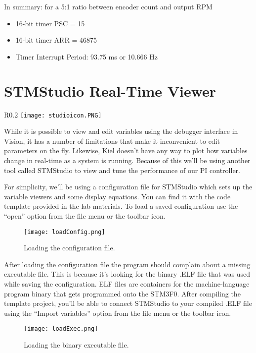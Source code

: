 \documentclass[openany,11pt,fleqn]{book} %
\begin{document}
In summary: for a 5:1 ratio between encoder count and output RPM
\begin{itemize}
    \item 16-bit timer PSC = 15 
    \item 16-bit timer ARR = 46875
    \item Timer Interrupt Period: 93.75 ms or 10.666 Hz
\end{itemize}


\section{STMStudio Real-Time Viewer}

\begin{wrapfigure}{R}{0.2\textwidth}
    \centering\texttt{[image: studioicon.PNG]}
\end{wrapfigure}

While it is possible to view and edit variables using the debugger interface in {\textmu}Vision, it has a number of limitations that make it inconvenient to edit parameters on the fly. Likewise, Kiel doesn't have any way to plot how variables change in real-time as a system is running. Because of this we'll be using another tool called STMStudio to view and tune the performance of our PI controller. 

\noindent For simplicity, we'll be using a configuration file for STMStudio which sets up the variable viewers and some display equations. You can find it with the code template provided in the lab materials. To load a saved configuration use the ``open'' option from the file menu or the toolbar icon.


\begin{figure}[tb]
    \centering\texttt{[image: loadConfig.png]}
    \caption{Loading the configuration file.}
    \label{loadConfig}
\end{figure}

After loading the configuration file the program should complain about a missing executable file. This is because it's looking for the binary .ELF file that was used while saving the configuration. ELF files are containers for the machine-language program binary that gets programmed onto the STM3F0. After compiling the template project, you'll be able to connect STMStudio to your compiled .ELF file using the ``Import variables'' option from the file menu or the toolbar icon.




\begin{figure}[tb]
    \centering\texttt{[image: loadExec.png]}
    \caption{Loading the binary executable file.}
    \label{loadExec}
\end{figure}
\end{document}
